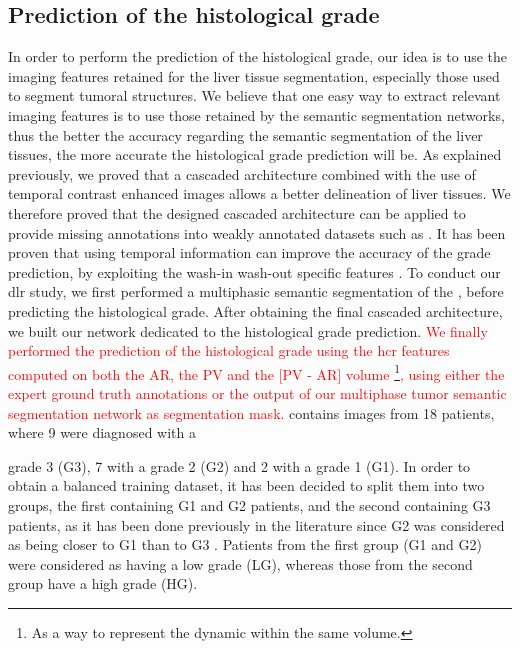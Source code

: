 \subsection{Prediction of the histological grade}\label{prediction-of-the-histological-grade-on-tcia-db}

In order to perform the prediction of the histological grade, our idea
is to use the imaging features retained for the liver tissue
segmentation, especially those used to segment tumoral structures.
We believe that one easy way to extract relevant imaging features is to
use those retained by the semantic segmentation networks, thus the
better the accuracy regarding the semantic segmentation of the liver
tissues, the more accurate the histological grade prediction will be.
As explained previously, we proved that a cascaded architecture combined
with the use of temporal contrast enhanced images allows a better
delineation of liver tissues. We therefore proved that the designed cascaded architecture can be applied to provide missing annotations into weakly annotated datasets such as \textbf{}.
It has been proven that using temporal information can improve the accuracy of the grade prediction, by exploiting the wash-in wash-out specific features \cite{Okamoto2012}.
To conduct our \ac{dlr} study, we first performed a multiphasic
semantic segmentation of the \textbf{}, before predicting the
histological grade.
After obtaining the final cascaded architecture, we built our network dedicated to the
histological grade prediction.
\textcolor{red}
{We finally performed the prediction of the histological grade using the \ac{hcr} features computed on both the AR, the PV and the [PV - AR] volume \footnote{As a way to represent the dynamic within the same volume.}, using either the expert ground truth annotations or the output of our multiphase tumor semantic segmentation network as segmentation mask.}
\textbf{} contains images from 18 patients, where 9 were diagnosed with a

grade 3 (G3), 7 with a grade 2 (G2) and 2 with a grade 1 (G1). In order
to obtain a balanced training dataset, it has been decided to split them
into two groups, the first containing G1 and G2 patients, and the second containing G3 patients, as it has been done previously in the literature since G2
was considered as being closer to G1 than to G3 \cite{Han2013,Zucman-Rossi2015}. Patients from the first group (G1 and G2) were considered as
having a low grade (LG), whereas those from the second group have a high
grade (HG).

